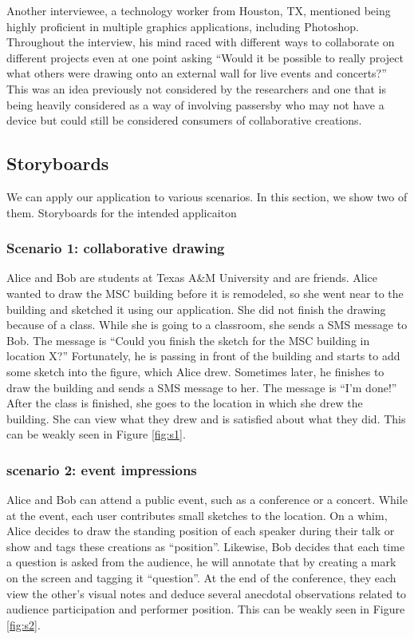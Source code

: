 \documentclass{chi2009}
\begin{document}
Another interviewee, a technology worker from Houston, TX, mentioned being
highly proficient in multiple graphics applications, including Photoshop.
Throughout the interview, his mind raced with different ways to collaborate on
different projects even at one point asking ``Would it be possible to really
project what others were drawing onto an external wall for live events and
concerts?''  This was an idea previously not considered by the researchers and
one that is being heavily considered as a way of involving passersby who may
not have a device but could still be considered consumers of collaborative
creations.

\subsection{Storyboards}
We can apply our application to various scenarios. In this section, we show two
of them.  Storyboards for the intended applicaiton 

\subsubsection{Scenario 1: collaborative drawing}

Alice and Bob are students at Texas A\&M University and are friends. Alice
wanted to draw the MSC building before it is remodeled, so she went near to the
building and sketched it using our application. She did not finish the drawing
because of a class. While she is going to a classroom, she sends a SMS message
to Bob. The message is ``Could you finish the sketch for the MSC building in
location X?'' Fortunately, he is passing in front of the building and starts to
add some sketch into the figure, which Alice drew. Sometimes later, he finishes
to draw the building and sends a SMS message to her. The message is ``I'm
done!'' After the class is finished, she goes to the location in which she drew
the building. She can view what they drew and is satisfied about what they did.
This can be weakly seen in Figure \ref{fig:s1}.

\subsubsection{scenario 2: event impressions}

Alice and Bob can attend a public event, such as a conference or a concert.
While at the event, each user contributes small sketches to the location.  On a
whim, Alice decides to draw the standing position of each speaker during their
talk or show and tags these creations as ``position''.  Likewise, Bob decides
that each time a question is asked from the audience, he will annotate that by
creating a mark on the screen and tagging it ``question''.  At the end of the
conference, they each view the other's visual notes and deduce several
anecdotal observations related to audience participation and performer
position.  This can be weakly seen in Figure \ref{fig:s2}.
\end{document}
